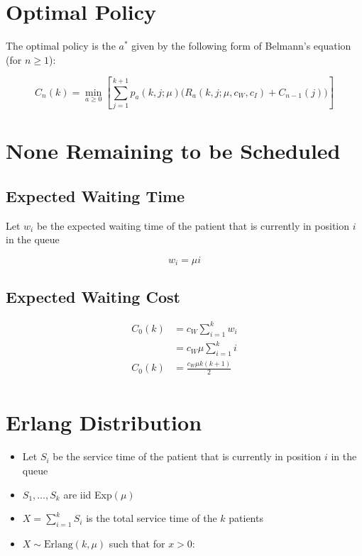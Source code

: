 \documentclass{article}
\begin{document}
\section{Optimal Policy}

The optimal policy is the $a^{*}$ given by the following form of Belmann's equation (for $n \geq 1$):

\begin{equation}
	C_{n} (k) = \min_{a \geq 0} \left[ \sum_{j = 1}^{k + 1} p_{a} (k, j; \mu) \Big( R_{a} (k, j; \mu, c_{W}, c_{I}) + C_{n - 1} (j) \Big) \right]
\end{equation}

\section{None Remaining to be Scheduled}

\subsection{Expected Waiting Time}

Let $w_{i}$ be the expected waiting time of the patient that is currently in position $i$ in the queue

\begin{equation*}
	w_{i} = \mu i
\end{equation*}

\newpage

\subsection{Expected Waiting Cost}

\begin{align*}
	C_{0} (k) & = c_{W} \sum_{i = 1}^{k} w_{i} \\
	& = c_{W} \mu \sum_{i = 1}^{k} i \\
	C_{0} (k) & = \frac{c_{W} \mu k (k + 1)}{2} \\
\end{align*}

\section{Erlang Distribution}

\begin{itemize}
	\item Let $S_{i}$ be the service time of the patient that is currently in position $i$ in the queue
	\item $S_{1}, \ldots, S_{k}$ are iid Exp$(\mu)$
	\item $X = \sum_{i = 1}^{k} S_{i}$ is the total service time of the $k$ patients
	\item $X \sim \text{Erlang} (k, \mu)$ such that for $x > 0$:
\end{itemize}
\end{document}
